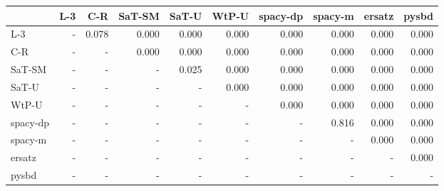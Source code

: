 \begin{tabular}{lrrrrrrrrr}
\toprule
 & L-3 & C-R & SaT-SM & SaT-U & WtP-U & spacy-dp & spacy-m & ersatz & pysbd \\
\midrule
L-3 & - & 0.078 & 0.000 & 0.000 & 0.000 & 0.000 & 0.000 & 0.000 & 0.000 \\
C-R & - & - & 0.000 & 0.000 & 0.000 & 0.000 & 0.000 & 0.000 & 0.000 \\
SaT-SM & - & - & - & 0.025 & 0.000 & 0.000 & 0.000 & 0.000 & 0.000 \\
SaT-U & - & - & - & - & 0.000 & 0.000 & 0.000 & 0.000 & 0.000 \\
WtP-U & - & - & - & - & - & 0.000 & 0.000 & 0.000 & 0.000 \\
spacy-dp & - & - & - & - & - & - & 0.816 & 0.000 & 0.000 \\
spacy-m & - & - & - & - & - & - & - & 0.000 & 0.000 \\
ersatz & - & - & - & - & - & - & - & - & 0.000 \\
pysbd & - & - & - & - & - & - & - & - & - \\
\bottomrule
\end{tabular}

